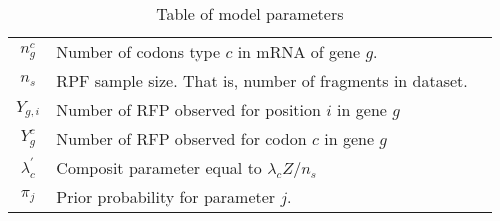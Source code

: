 \documentclass{article}
\newcommand{\lambdac}{\ensuremath{{\lambda_c}}\xspace}
\newcommand{\lambdacprime}{\ensuremath{{\lambda_c^\prime}}\xspace}
\newcommand{\ngc}{\ensuremath{{n_{g}^c}}\xspace}
\newcommand{\ns}{\ensuremath{{n_s}}\xspace}
\newcommand{\Ygi}{\ensuremath{{Y_{g,i}}}\xspace}
\newcommand{\Ygc}{\ensuremath{{Y_{g}^c}}\xspace}
\begin{document}
\begin{table}[H!]
\begin{tabulary}{\textwidth}{|C|L|C|}
    \ngc & Number of codons type $c$ in mRNA of gene $g$. &  \\
    \ns & RPF sample size. That is, number of fragments in dataset.& \\
    \Ygi & Number of RFP observed for position $i$ in gene $g$ &\\
    \Ygc & Number of RFP observed for codon $c$ in gene $g$ &\\
    \lambdacprime& Composit parameter equal to $\lambdac Z/\ns$ &\\
    $\pi_j$  & Prior probability for parameter $j$. & \\ \hline
  \end{tabulary}
   \caption{Table of model parameters}
  \label{tab:modelParam}
\end{table}




\end{document}
